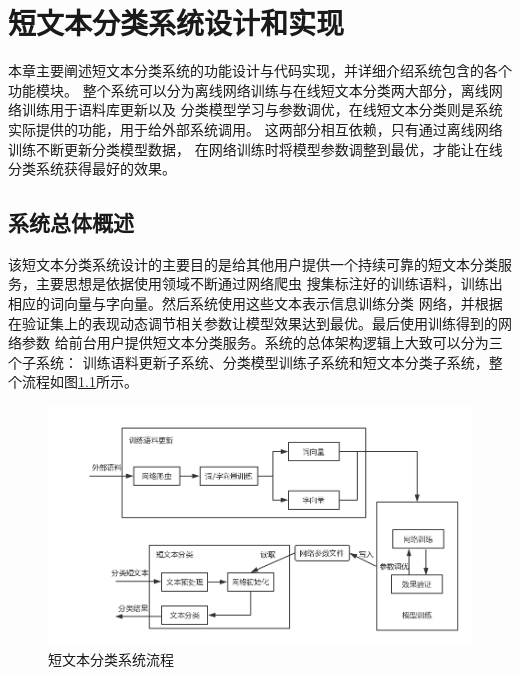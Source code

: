 \chapter{短文本分类系统设计和实现}
本章主要阐述短文本分类系统的功能设计与代码实现，并详细介绍系统包含的各个功能模块。
整个系统可以分为离线网络训练与在线短文本分类两大部分，离线网络训练用于语料库更新以及
分类模型学习与参数调优，在线短文本分类则是系统实际提供的功能，用于给外部系统调用。
这两部分相互依赖，只有通过离线网络训练不断更新分类模型数据，
在网络训练时将模型参数调整到最优，才能让在线分类系统获得最好的效果。
\section{系统总体概述}
该短文本分类系统设计的主要目的是给其他用户提供一个持续可靠的短文本分类服务，主要思想是依据使用领域不断通过网络爬虫
搜集标注好的训练语料，训练出相应的词向量与字向量。然后系统使用这些文本表示信息训练分类
网络，并根据在验证集上的表现动态调节相关参数让模型效果达到最优。最后使用训练得到的网络参数
给前台用户提供短文本分类服务。系统的总体架构逻辑上大致可以分为三个子系统：
训练语料更新子系统、分类模型训练子系统和短文本分类子系统，整个流程如图\ref{system_architecture}所示。
\begin{figure}[h]
    \includegraphics[scale=0.45]{picture/system_architecture.png}
    \caption{短文本分类系统流程}
    \label{system_architecture}
\end{figure}

